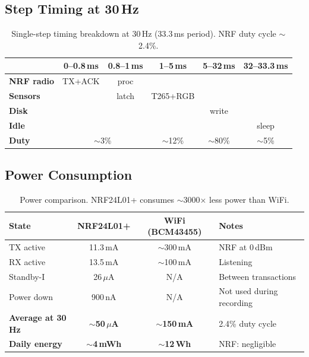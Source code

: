 \documentclass[11pt,a4paper]{article}
\begin{document}
\subsection{Step Timing at 30\,Hz}

\begin{table}[htbp]
\centering
\caption{Single-step timing breakdown at 30\,Hz (33.3\,ms period). NRF duty cycle ${\sim}$2.4\%.}
\setlength{\tabcolsep}{4pt}
\begin{tabular}{l c c c c c}
\toprule
 & 0--0.8\,ms & 0.8--1\,ms & 1--5\,ms & 5--32\,ms & 32--33.3\,ms \\
\midrule
\textbf{NRF radio} & \cellcolor{nodered}TX+ACK & \cellcolor{nodered}proc & & & \\
\textbf{Sensors} & & \cellcolor{nodeblue}latch & \cellcolor{nodeblue}T265+RGB & & \\
\textbf{Disk} & & & & \cellcolor{nodegreen}write & \\
\textbf{Idle} & & & & & \cellcolor{black!8}sleep \\
\midrule
\textbf{Duty} & \multicolumn{2}{c}{\cellcolor{nodeyellow}${\sim}$3\%} & \cellcolor{nodeyellow}${\sim}$12\% & \cellcolor{nodeyellow}${\sim}$80\% & \cellcolor{nodeyellow}${\sim}$5\% \\
\bottomrule
\end{tabular}
\label{tab:step-timing}
\end{table}

\subsection{Power Consumption}

\begin{table}[htbp]
\centering
\caption{Power comparison. NRF24L01+ consumes ${\sim}$3000$\times$ less power than WiFi.}
\begin{tabular}{l c c l}
\toprule
\textbf{State} & \textbf{NRF24L01+} & \textbf{WiFi (BCM43455)} & \textbf{Notes} \\
\midrule
TX active & 11.3\,mA & ${\sim}$300\,mA & NRF at 0\,dBm \\
RX active & 13.5\,mA & ${\sim}$100\,mA & Listening \\
Standby-I & 26\,$\mu$A & N/A & Between transactions \\
Power down & 900\,nA & N/A & Not used during recording \\
\midrule
\textbf{Average at 30\,Hz} & \textbf{${\sim}$50\,$\mu$A} & \textbf{${\sim}$150\,mA} & 2.4\% duty cycle \\
\textbf{Daily energy} & \textbf{${\sim}$4\,mWh} & \textbf{${\sim}$12\,Wh} & NRF: negligible \\
\bottomrule
\end{tabular}
\label{tab:power}
\end{table}
\end{document}
